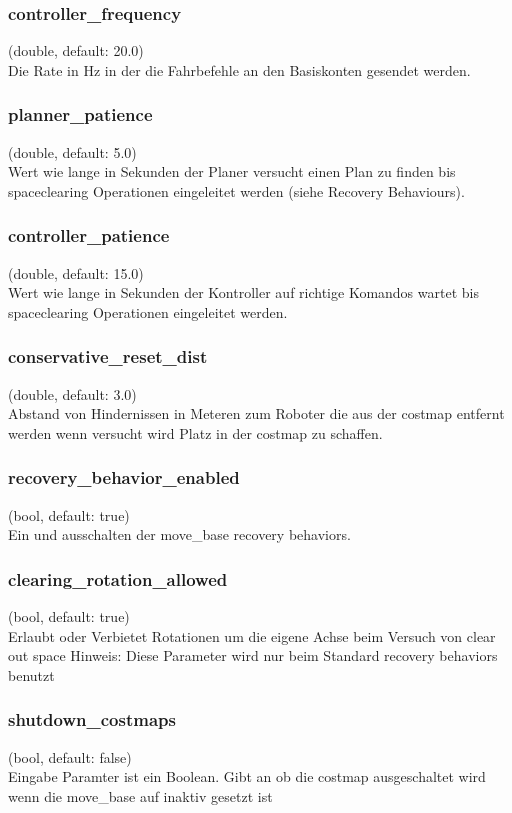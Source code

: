 \documentclass[oribibl]{llncs}
\begin{document}
\subsubsection{controller\_frequency} (double, default: 20.0)\\
	Die Rate in Hz in der die Fahrbefehle an den Basiskonten gesendet werden.
	
\subsubsection{planner\_patience} (double, default: 5.0)\\
	Wert wie lange in Sekunden der Planer versucht einen Plan zu finden bis spaceclearing Operationen eingeleitet werden (siehe Recovery Behaviours).
	
\subsubsection{controller\_patience} (double, default: 15.0)\\
	Wert wie lange in Sekunden der Kontroller auf richtige Komandos wartet bis spaceclearing Operationen eingeleitet werden.
	
\subsubsection{conservative\_reset\_dist} (double, default: 3.0)\\
	Abstand von Hindernissen in Meteren zum Roboter die aus der costmap entfernt 	werden wenn versucht wird Platz in der costmap zu schaffen.
	
\subsubsection{recovery\_behavior\_enabled} (bool, default: true)\\
	Ein und ausschalten der move\_base recovery behaviors.

\subsubsection{clearing\_rotation\_allowed} (bool, default: true)\\
	Erlaubt oder Verbietet Rotationen um die eigene Achse beim Versuch von clear out 	space
	Hinweis: Diese Parameter wird nur beim Standard recovery behaviors benutzt

\subsubsection{shutdown\_costmaps} (bool, default: false)\\
	Eingabe Paramter ist ein Boolean. Gibt an ob die costmap ausgeschaltet wird wenn 	die move\_base auf inaktiv gesetzt ist
\end{document}
